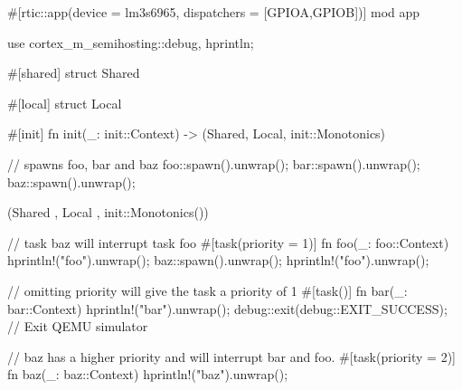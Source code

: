 #[rtic::app(device = lm3s6965, dispatchers = [GPIOA,GPIOB])]
mod app {
    use cortex_m_semihosting::{debug, hprintln};

    #[shared]
    struct Shared {}

    #[local]
    struct Local {}

    #[init]
    fn init(_: init::Context) -> (Shared, Local, init::Monotonics) {
        // spawns foo, bar and baz
        foo::spawn().unwrap(); 
        bar::spawn().unwrap();
        baz::spawn().unwrap();

        (Shared {}, Local {}, init::Monotonics())
    }

    // task baz will interrupt task foo
    #[task(priority = 1)]
    fn foo(_: foo::Context) {
        hprintln!("foo").unwrap();
        baz::spawn().unwrap();
        hprintln!("foo").unwrap();
    }

    // omitting priority will give the task a priority of 1
    #[task()]
    fn bar(_: bar::Context){
        hprintln!("bar").unwrap();
        debug::exit(debug::EXIT_SUCCESS); // Exit QEMU simulator
    }

    // baz has a higher priority and will interrupt bar and foo.
    #[task(priority = 2)]
    fn baz(_: baz::Context){
        hprintln!("baz").unwrap();
    }
}
